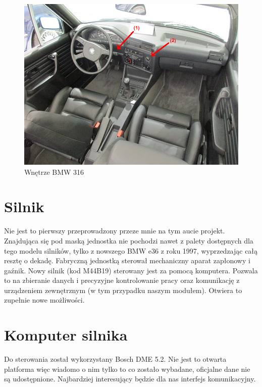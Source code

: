 \documentclass[declaration,shortabstract, inz]{iithesis}
\begin{document}
\begin{figure}[htp]
    \centering
    \includegraphics[width=12cm]{images/bmw_e30_interior_marked.png}
    \caption{Wnętrze BMW 316}
    \label{fig:e30_interior}
\end{figure}
\FloatBarrier

\section{Silnik}
Nie jest to pierwszy przeprowadzony przeze mnie na tym aucie projekt. Znajdująca się pod maską jednostka nie pochodzi nawet z palety dostępnych dla tego modelu silników, tylko z nowszego BMW e36 z roku 1997, wyprzedzając całą resztę o dekadę. Fabryczną jednostką sterował mechaniczny aparat zapłonowy i gaźnik. Nowy silnik (kod M44B19) sterowany jest za pomocą komputera. Pozwala to na zbieranie danych i precyzyjne kontrolowanie pracy oraz komunikację z urządzeniem zewnętrznym (w tym przypadku naszym modułem). Otwiera to zupełnie nowe możliwości.

\section{Komputer silnika}
Do sterowania został wykorzystany Bosch DME 5.2. Nie jest to otwarta platforma więc wiadomo o nim tylko to co zostało wybadane, oficjalne dane nie są udostępnione. Najbardziej interesujący będzie dla nas interfejs komunikacyjny. 

\end{document}
